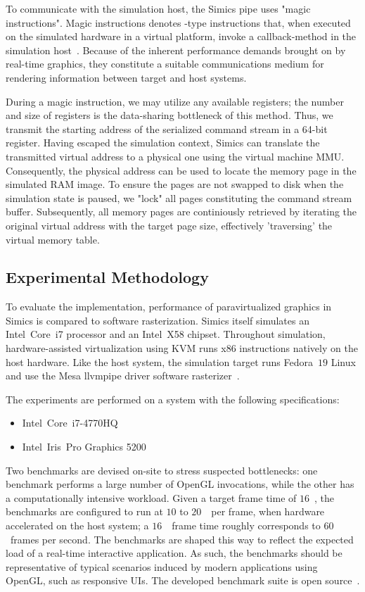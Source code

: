 To communicate with the simulation host, the Simics pipe uses "magic instructions".
Magic instructions denotes -type instructions that, when executed on the simulated hardware in a virtual platform, invoke a callback-method in the simulation host~.
Because of the inherent performance demands brought on by real-time graphics, they constitute a suitable communications medium for rendering information between target and host systems.

During a magic instruction, we may utilize any available registers; the number and size of registers is the data-sharing bottleneck of this method.
Thus, we transmit the starting address of the serialized command stream in a 64-bit register.
Having escaped the simulation context, Simics can translate the transmitted virtual address to a physical one using the virtual machine MMU.
Consequently, the physical address can be used to locate the memory page in the simulated RAM image.
To ensure the pages are not swapped to disk when the simulation state is paused, we "lock" all pages constituting the command stream buffer.
Subsequently, all memory pages are continiously retrieved by iterating the original virtual address with the target page size, effectively 'traversing' the virtual memory table.

\subsection{Experimental Methodology}
\label{sec:experimentalmethodology}
To evaluate the implementation, performance of paravirtualized graphics in Simics is compared to software rasterization.
Simics itself simulates an Intel\circledR ~Core\texttrademark ~i7 processor and an Intel\circledR ~X58 chipset.
Throughout simulation, hardware-assisted virtualization using KVM runs x86 instructions natively on the host hardware.
Like the host system, the simulation target runs Fedora~$19$ Linux and use the Mesa llvmpipe driver software rasterizer~.

The experiments are performed on a system with the following specifications:
\begin{itemize}
\item Intel\circledR\ Core\texttrademark\ i7-4770HQ
\item Intel\circledR\ Iris\texttrademark\ Pro Graphics 5200
\end{itemize}

Two benchmarks are devised on-site to stress suspected bottlenecks: one benchmark performs a large number of OpenGL invocations, while the other has a computationally intensive workload.
Given a target frame time of $16$~\milli\second , the benchmarks are configured to run at $10$ to $20$~\milli\second\ per frame, when hardware accelerated on the host system; a $16$~\milli\second\ frame time roughly corresponds to $60$~frames per second.
The benchmarks are shaped this way to reflect the expected load of a real-time interactive application.
As such, the benchmarks should be representative of typical scenarios induced by modern applications using OpenGL, such as responsive UIs.
The developed benchmark suite is open source~.

